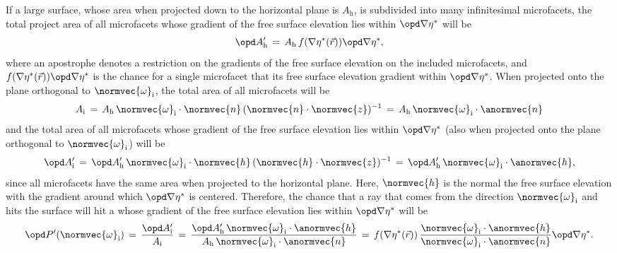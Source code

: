 If a large surface, whose area when projected down to the horizontal plane is $A_{\text{h}}$, is subdivided into many infinitesimal microfacets, the total project area of all microfacets whose gradient of the free surface elevation lies within $\opd\nabla\eta^*$ will be
%
\begin{equation}
\opd A'_{\text{h}} \,=\, A_{\text{h}}\,f(\nabla\eta^*(\vec{r}))\opd\nabla\eta^*,
\end{equation}
%
where an apostrophe denotes a restriction on the gradients of the free surface elevation on the included microfacets, and $f(\nabla\eta^*(\vec{r}))\opd \nabla\eta^*$ is the chance for a single microfacet that its free surface elevation gradient within $\opd\nabla\eta^*$. When projected onto the plane orthogonal to $\normvec{\omega}_{\text{i}}$, the total area of all microfacets will be
%
\begin{equation}
A_{\text{i}} \,=\, A_{\text{h}}\,\normvec{\omega}_{\text{i}}\cdot\normvec{n}\,(\normvec{n}\cdot\normvec{z})^{-1} \,=\, A_{\text{h}}\,\normvec{\omega}_{\text{i}}\cdot\anormvec{n}
\end{equation}
%
and the total area of all microfacets whose gradient of the free surface elevation lies within $\opd\nabla\eta^*$ (also when projected onto the plane orthogonal to $\normvec{\omega}_{\text{i}}$) will be
%
\begin{equation}
\opd A'_{\text{i}} \,=\, \opd A'_{\text{h}}\,\normvec{\omega}_{\text{i}}\cdot\normvec{h}\,(\normvec{h}\cdot\normvec{z})^{-1} \,=\, \opd A'_{\text{h}}\,\normvec{\omega}_{\text{i}}\cdot\anormvec{h},
\end{equation}
%
since all microfacets have the same area when projected to the horizontal plane. Here, $\normvec{h}$ is the normal the free surface elevation with the gradient around which $\opd\nabla\eta^*$ is centered. Therefore, the chance that a ray that comes from the direction $\normvec{\omega}_{\text{i}}$ and hits the surface will hit a \microfacet whose gradient of the free surface elevation lies within $\opd\nabla\eta^*$ will be
%
\begin{equation} \label{eq:gradient_restricted_reflection_probability}
\opd P'(\normvec{\omega}_{\text{i}}) \,=\, \frac{\opd A'_{\text{i}}}{A_{\text{i}}} \,=\, \frac{\opd A'_{\text{h}}\,\normvec{\omega}_{\text{i}}\cdot\anormvec{h}}{A_{\text{h}}\,\normvec{\omega}_{\text{i}}\cdot\anormvec{n}} \,=\, f(\nabla\eta^*(\vec{r}))\,\frac{\normvec{\omega}_{\text{i}}\cdot\anormvec{h}}{\normvec{\omega}_{\text{i}}\cdot\anormvec{n}}\opd \nabla\eta^*.
\end{equation}

